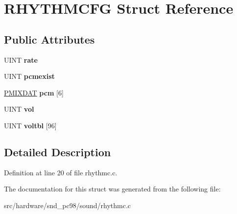 \hypertarget{structRHYTHMCFG}{\section{R\-H\-Y\-T\-H\-M\-C\-F\-G Struct Reference}
\label{structRHYTHMCFG}
}
\subsection*{Public Attributes}
\begin{DoxyCompactItemize}
\item 
\hypertarget{structRHYTHMCFG_a173fea07210e806b646e7f1318c91d51}{U\-I\-N\-T {\bfseries rate}}\label{structRHYTHMCFG_a173fea07210e806b646e7f1318c91d51}

\item 
\hypertarget{structRHYTHMCFG_a23dd73fa87f2bd7d07e499ca9a8ff3b7}{U\-I\-N\-T {\bfseries pcmexist}}\label{structRHYTHMCFG_a23dd73fa87f2bd7d07e499ca9a8ff3b7}

\item 
\hypertarget{structRHYTHMCFG_aa24a75f34ffda309dd2b9d668b1d8455}{\hyperlink{structPMIXDAT}{P\-M\-I\-X\-D\-A\-T} {\bfseries pcm} \mbox{[}6\mbox{]}}\label{structRHYTHMCFG_aa24a75f34ffda309dd2b9d668b1d8455}

\item 
\hypertarget{structRHYTHMCFG_a12d7c746e36f7a9e878bf0e006650e88}{U\-I\-N\-T {\bfseries vol}}\label{structRHYTHMCFG_a12d7c746e36f7a9e878bf0e006650e88}

\item 
\hypertarget{structRHYTHMCFG_a2acd84d09fdfa60d61856e024d473017}{U\-I\-N\-T {\bfseries voltbl} \mbox{[}96\mbox{]}}\label{structRHYTHMCFG_a2acd84d09fdfa60d61856e024d473017}

\end{DoxyCompactItemize}


\subsection{Detailed Description}


Definition at line 20 of file rhythmc.\-c.



The documentation for this struct was generated from the following file\-:\begin{DoxyCompactItemize}
\item 
src/hardware/snd\-\_\-pc98/sound/rhythmc.\-c\end{DoxyCompactItemize}
